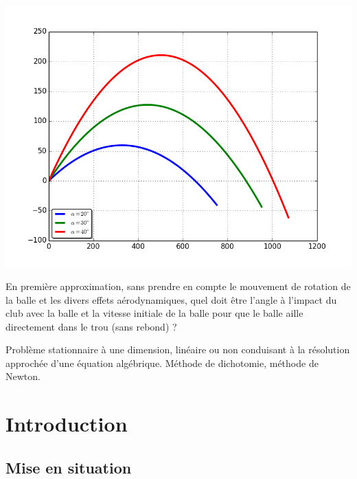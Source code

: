\documentclass[10pt]{article}
\begin{document}
\begin{minipage}[c]{.45\linewidth}
\begin{center}
\includegraphics[width=.95\textwidth]{images/tir_alpha}
\end{center}
\end{minipage}
\vspace{.5cm}

En première approximation, sans prendre en compte le mouvement de rotation de la balle et les divers effets aérodynamiques, quel doit être l'angle à l'impact du club avec la balle et la vitesse initiale de la balle pour que le balle aille directement dans le trou (sans rebond) ?

\begin{savoir}
Problème stationnaire à une dimension, linéaire ou non conduisant à la résolution
approchée d’une équation algébrique.%
Méthode de dichotomie,
méthode de Newton.
\end{savoir}



\setlength{\parskip}{0ex plus 0.2ex minus 0ex}
 \renewcommand{\contentsname}{}
 \renewcommand{\baselinestretch}{1}

\tableofcontents

 \renewcommand{\baselinestretch}{1.2}
\setlength{\parskip}{2ex plus 0.5ex minus 0.2ex}


\section{Introduction}
\subsection{Mise en situation}
\end{document}
